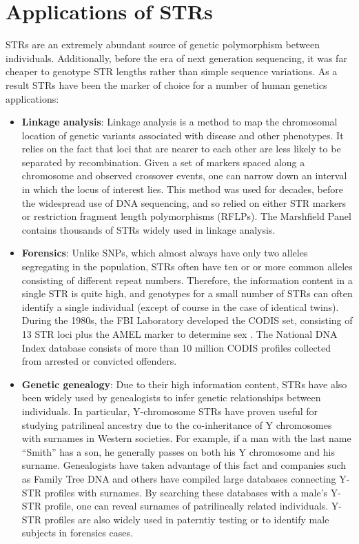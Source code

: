 \section{Applications of STRs}
STRs are an extremely abundant source of genetic polymorphism between individuals. Additionally, before the era of next generation sequencing, it was far cheaper to genotype STR lengths rather than simple sequence variations. As a result STRs have been the marker of choice for a number of human genetics applications:
\begin{itemize}
\item \textbf{Linkage analysis}: Linkage analysis is a method to map the chromosomal location of genetic variants associated with disease and other phenotypes. It relies on the fact that loci that are nearer to each other are less likely to be separated by recombination. Given a set of markers spaced along a chromosome and observed crossover events, one can narrow down an interval in which the locus of interest lies. This method was used for decades, before the widespread use of DNA sequencing, and so relied on either STR markers or restriction fragment length polymorphisms (RFLPs). The Marshfield Panel \cite{BromanMurraySheffieldEtAl1998} contains thousands of STRs widely used in linkage analysis. 
\item \textbf{Forensics}: Unlike SNPs, which almost always have only two alleles segregating in the population, STRs often have ten or or more common alleles consisting of different repeat numbers. Therefore, the information content in a single STR is quite high, and genotypes for a small number of STRs can often identify a single individual (except of course in the case of identical twins). During the 1980s, the FBI Laboratory developed the CODIS set, consisting of 13 STR loci plus the AMEL marker to determine sex \cite{BudowleSheaNiezgodaEtAl2001}. The National DNA Index database consists of more than 10 million CODIS profiles collected from arrested or convicted offenders. 
\item \textbf{Genetic genealogy}: Due to their high information content, STRs have also been widely used by genealogists to infer genetic relationships between individuals. In particular, Y-chromosome STRs have proven useful for studying patrilineal ancestry due to the co-inheritance of Y chromosomes with surnames in Western societies. For example, if a man with the last name ``Smith'' has a son, he generally passes on both his Y chromosome and his surname. Genealogists have taken advantage of this fact and companies such as Family Tree DNA and others have compiled large databases connecting Y-STR profiles with surnames. By searching these databases with a male's Y-STR profile, one can reveal surnames of patrilineally related individuals. Y-STR profiles are also widely used in paterntiy testing or to identify male subjects in forensics cases.
\end{itemize}


